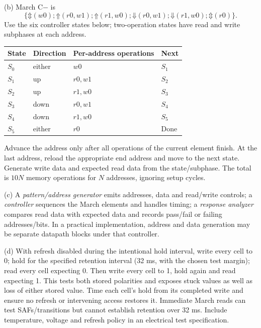 \documentclass[11pt]{article}
\newcommand{\up}{\mathord{\Uparrow}}
\newcommand{\dn}{\mathord{\Downarrow}}
\newcommand{\any}{\mathord{\Updownarrow}}
\begin{document}
(b) March C$-$ is
\[
\{\any(w0);\up(r0,w1);\up(r1,w0);
  \dn(r0,w1);\dn(r1,w0);\any(r0)\}.
\]
Use the six controller states below; two-operation states have read and write
subphases at each address.
\begin{center}\begin{tabular}{llll}\toprule State & Direction & Per-address operations & Next\\\midrule
$S_0$ & either & $w0$ & $S_1$\\
$S_1$ & up & $r0,w1$ & $S_2$\\
$S_2$ & up & $r1,w0$ & $S_3$\\
$S_3$ & down & $r0,w1$ & $S_4$\\
$S_4$ & down & $r1,w0$ & $S_5$\\
$S_5$ & either & $r0$ & Done\\\bottomrule
\end{tabular}\end{center}
Advance the address only after all operations of the current element finish.
At the last address, reload the appropriate end address and move to the next
state. Generate write data and expected read data from the state/subphase.
The total is $10N$ memory operations for $N$ addresses, ignoring setup cycles.

(c) A \emph{pattern/address generator} emits addresses, data and read/write
controls; a \emph{controller} sequences the March elements and handles timing;
a \emph{response analyzer} compares read data with expected data and records
pass/fail or failing addresses/bits. In a practical implementation, address and
data generation may be separate datapath blocks under that controller.

(d) With refresh disabled during the intentional hold interval, write every
cell to 0; hold for the specified retention interval (32 ms, with the chosen
test margin); read every cell expecting 0. Then write every cell to 1, hold
again and read expecting 1. This tests both stored polarities and exposes
stuck values as well as loss of either stored value. Time each cell's hold
from its completed write and ensure no refresh or intervening access restores
it. Immediate March reads can test SAFs/transitions but cannot establish
retention over 32 ms. Include temperature, voltage and refresh policy in an
electrical test specification.
\end{document}

